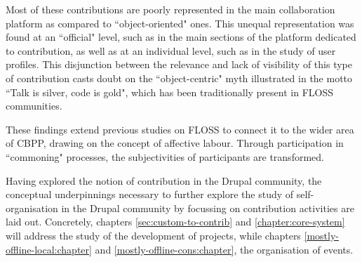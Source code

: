 Most of these contributions are poorly represented in the main collaboration platform as compared to ``object-oriented" ones. This unequal representation was found at an ``official" level, such as in the main sections of the platform dedicated to contribution, as well as at an individual level, such as in the study of user profiles. This disjunction between the relevance and lack of visibility of this type of contribution casts doubt on the ``object-centric" myth illustrated in the motto ``Talk is silver, code is gold", which has been traditionally present in FLOSS communities.

These findings extend previous studies on FLOSS to connect it to the wider area of CBPP, drawing on the concept of affective labour. Through  participation in ``commoning" processes, the subjectivities of  participants are transformed.

Having explored the notion of contribution in the Drupal community, the conceptual underpinnings necessary to further explore the study of self-organisation in the Drupal community by focussing on contribution activities are laid out. Concretely, chapters \ref{sec:custom-to-contrib} and \ref{chapter:core-system} will address the study of the development of projects, while chapters \ref{mostly-offline-local:chapter} and \ref{mostly-offline-cons:chapter}, the organisation of events.